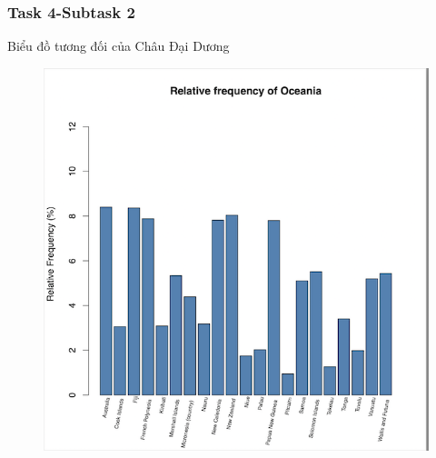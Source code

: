 \documentclass[english,10pt,table]{beamer}
\begin{document}
\frame
{
    \frametitle{Task 4-Subtask 2}
    \begin{block}{Biểu đồ tương đối của Châu Đại Dương}
    \begin{figure}
        \centering
        \includegraphics[scale=0.5]{images/4.2.6.png}
    \end{figure}
    \end{block}
}
\end{document}
